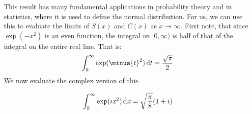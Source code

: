     This result has many fundamental applications in
    probability theory and in statistics, where
    it is used to define the normal distribution.
    For us, we can use this to evaluate the limits of
    $S(x)$ and $C(x)$ as $x\rightarrow\infty$.
    First note, that since $\exp(-x^{2})$ is an even
    function, the integral on $[0,\infty)$ is half of
    that of the integral on the entire real line. That is:
    \begin{equation}
        \int_{0}^{\infty}\exp(\minus{t}^{2})\diff{t}
        =\frac{\sqrt{\pi}}{2}
    \end{equation}
    We now evaluate the complex version of this.
    \begin{theorem}
        \begin{equation}
            \int_{0}^{\infty}\exp(ix^{2})\mathop{}\!\mathrm{d}{x}
            =\sqrt{\frac{\pi}{8}}(1+i)
        \end{equation}
    \end{theorem}
